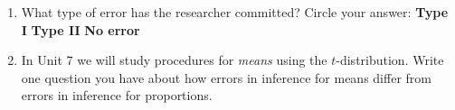 \documentclass[10pt]{article}
\begin{document}
\begin{enumerate}
        \begin{enumerate}[label=\alph*.]
          \item What type of error has the researcher committed? Circle your answer:
                \quad \textbf{Type I} \quad \textbf{Type II} \quad \textbf{No error}

                \vspace{0.05in}
          \item In Unit 7 we will study procedures for \emph{means} using the
                $t$-distribution. Write one question you have about how errors in
                inference for means differ from errors in inference for proportions.

        \end{enumerate}
\end{enumerate}
\end{document}
